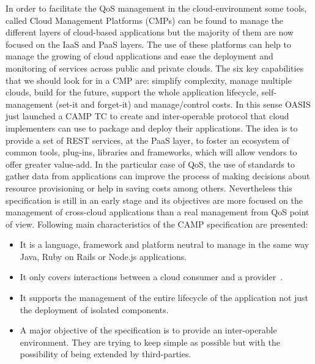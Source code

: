 In order to facilitate the QoS management in the cloud-environment some tools, called Cloud Management Platforms (CMPs) can be found 
to manage the different layers of cloud-based applications but the majority of them are now focused on the IaaS and PaaS layers. 
The use of these platforms can help to manage the growing of cloud applications and ease the deployment and monitoring of services across 
public and private clouds. The six key capabilities~\cite{Kephart2012} that we should look for in a CMP are: simplify complexity, 
manage multiple clouds, build for the future, support the whole application lifecycle, self-management (set-it and forget-it) and manage/control costs. 
In this sense OASIS just launched a CAMP TC to create and inter-operable protocol that cloud 
implementers can use to package and deploy their applications. The idea is to provide a set of REST services, at the PaaS layer, to foster an ecosystem of 
common tools, plug-ins, libraries and frameworks, which will allow vendors to offer greater value-add. In the particular case of QoS, the use of standards to gather data 
from applications can improve the process of making decisions about resource provisioning or help in saving costs among others. Nevertheless 
this specification is still in an early stage and its objectives are more focused on the management of cross-cloud applications than a 
real management from QoS point of view. Following main characteristics of the CAMP specification are presented:
\begin{itemize}
 \item It is a language, framework and platform neutral to manage in the same way Java, Ruby on Rails or Node.js applications.
 \item It only covers interactions between a cloud consumer and a provider~\cite{mell2011nist}.
 \item It supports the management of the entire lifecycle of the application not just the deployment of isolated components.
 \item A major objective of the specification is to provide an inter-operable environment. They are trying to keep simple as 
 possible but with the possibility of being extended by third-parties.
\end{itemize}

